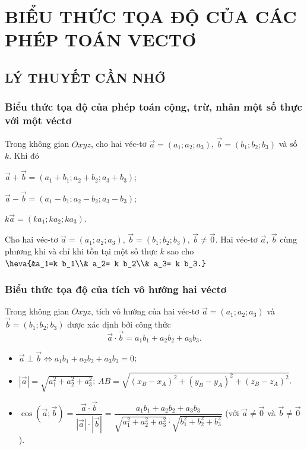 \section{BIỂU THỨC TỌA ĐỘ CỦA CÁC PHÉP TOÁN VECTƠ}
\subsection{LÝ THUYẾT CẦN NHỚ}
\subsubsection{Biểu thức tọa độ của phép toán cộng, trừ, nhân một số thực với một véctơ}
Trong không gian $Oxyz$, cho hai véc-tơ $\vec{a} = (a_1;a_2;a_3)$, $\vec{b} = (b_1; b_2; b_3)$ và số $k$. Khi đó
\begin{listEX}[1]
	\item [\ding{172}] $\vec{a}+\vec{b}=(a_1+b_1;a_2+b_2;a_3+b_3)$;
	\item [\ding{173}] $\vec{a}-\vec{b}=(a_1-b_1;a_2-b_2;a_3-b_3)$;
	\item [\ding{174}] $k\vec{a} = (ka_1; ka_2; ka_3)$.
\end{listEX}
\begin{note}
	Cho hai véc-tơ $\vec{a}=(a_1;a_2;a_3)$, $\vec{b}=(b_1;b_2;b_3)$, $\vec{b}\ne \vec{0}$. Hai véc-tơ $\vec{a}$, $\vec{b}$ cùng phương khi và chỉ khi tồn tại một số thực $k$ sao cho $\heva{&a_1=k b_1\\& a_2= k b_2\\& a_3= k b_3.}$
\end{note}
\subsubsection{Biểu thức tọa độ của tích vô hướng hai véctơ}
Trong không gian $Oxyz$, tích vô hướng của hai véc-tơ $\vec{a} = (a_1;a_2;a_3)$ và $\vec{b} = (b_1; b_2; b_3)$ được xác định bởi công thức
\[\vec{a} \cdot \vec{b} = a_1b_1 + a_2b_2 + a_3b_3. \]
\begin{note}
	\begin{itemize}
		\item[\ding{172}] $\vec{a} \perp \vec{b} \Leftrightarrow a_1b_1 + a_2b_2 + a_3b_3 = 0$;
		\item[\ding{173}] $\left| \vec{a} \right| = \sqrt{a_1^2 + a_2^2 +a_3^2}$; \quad $AB=\sqrt{(x_B-x_A)^2+(y_B-y_A)^2+(z_B-z_A)^2}$.
		\item[\ding{174}] $\cos \left(\vec{a}; \vec{b}\right) = \dfrac{\vec{a}\cdot \vec{b}}{\left|\vec{a}\right| \cdot \left|\vec{b}\right|} = \dfrac{a_1b_1 + a_2b_2 + a_3b_3}{\sqrt{a_1^2 + a_2^2 +a_3^2} \cdot \sqrt{b_1^2 + b_2^2 +b_3^2}}$ (với $\vec{a} \ne \vec{0}$ và $\vec{b} \ne \vec{0}$).
	\end{itemize}
\end{note}
